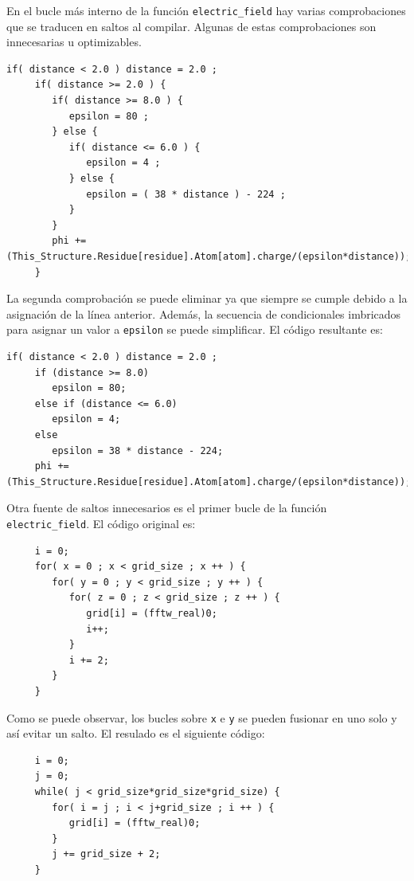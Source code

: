 En el bucle m\'{a}s interno de la funci\'{o}n \texttt{electric\_field} hay
varias comprobaciones que se traducen en saltos al compilar. Algunas de estas
comprobaciones son innecesarias u optimizables.

\begin{lstlisting}[]
     if( distance < 2.0 ) distance = 2.0 ;
     if( distance >= 2.0 ) {
        if( distance >= 8.0 ) {
           epsilon = 80 ;
        } else {
           if( distance <= 6.0 ) {
              epsilon = 4 ;
           } else {
              epsilon = ( 38 * distance ) - 224 ;
           }
        }
        phi += (This_Structure.Residue[residue].Atom[atom].charge/(epsilon*distance));
     }
\end{lstlisting}

La segunda comprobaci\'{o}n se puede eliminar ya que siempre se cumple debido a
la asignaci\'{o}n de la l\'{i}nea anterior. Adem\'{a}s, la secuencia de
condicionales imbricados para asignar un valor a \texttt{epsilon} se puede
simplificar. El c\'{o}digo resultante es:

\begin{lstlisting}[]
     if( distance < 2.0 ) distance = 2.0 ;
     if (distance >= 8.0)
        epsilon = 80;
     else if (distance <= 6.0)
        epsilon = 4;
     else
        epsilon = 38 * distance - 224;
     phi += (This_Structure.Residue[residue].Atom[atom].charge/(epsilon*distance));
\end{lstlisting}

Otra fuente de saltos innecesarios es el primer bucle de la funci\'{o}n
\texttt{electric\_field}. El c\'{o}digo original es:

\begin{lstlisting}
     i = 0;
     for( x = 0 ; x < grid_size ; x ++ ) {
        for( y = 0 ; y < grid_size ; y ++ ) {
           for( z = 0 ; z < grid_size ; z ++ ) {
              grid[i] = (fftw_real)0;
              i++;
           }
           i += 2;
        }
     }
\end{lstlisting}

Como se puede observar, los bucles sobre \texttt{x} e \texttt{y} se pueden
fusionar en uno solo y as\'{i} evitar un salto. El resulado es el siguiente
c\'{o}digo:

\begin{lstlisting}
     i = 0; 
     j = 0;
     while( j < grid_size*grid_size*grid_size) {
        for( i = j ; i < j+grid_size ; i ++ ) {
           grid[i] = (fftw_real)0;
        }
        j += grid_size + 2;
     }
\end{lstlisting}

